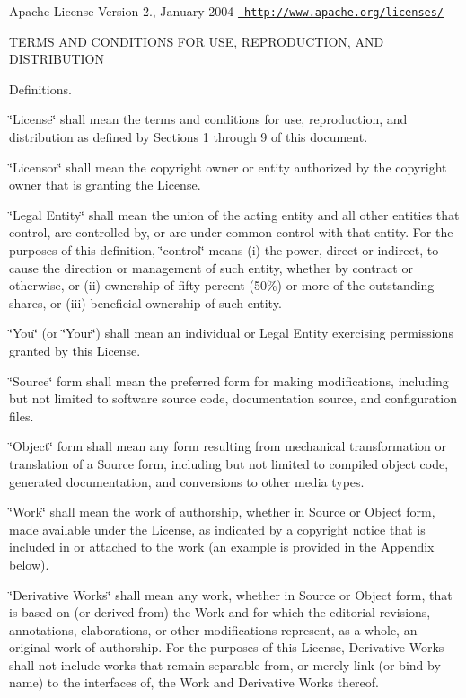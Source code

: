 Apache License Version 2., January 2004 \href{http://www.apache.org/licenses/}{\texttt{ http\+://www.\+apache.\+org/licenses/}}

TERMS AND CONDITIONS FOR USE, REPRODUCTION, AND DISTRIBUTION


\begin{DoxyEnumerate}
\item Definitions.

\char`\"{}\+License\char`\"{} shall mean the terms and conditions for use, reproduction, and distribution as defined by Sections 1 through 9 of this document.

\char`\"{}\+Licensor\char`\"{} shall mean the copyright owner or entity authorized by the copyright owner that is granting the License.

\char`\"{}\+Legal Entity\char`\"{} shall mean the union of the acting entity and all other entities that control, are controlled by, or are under common control with that entity. For the purposes of this definition, \char`\"{}control\char`\"{} means (i) the power, direct or indirect, to cause the direction or management of such entity, whether by contract or otherwise, or (ii) ownership of fifty percent (50\%) or more of the outstanding shares, or (iii) beneficial ownership of such entity.

\char`\"{}\+You\char`\"{} (or \char`\"{}\+Your\char`\"{}) shall mean an individual or Legal Entity exercising permissions granted by this License.

\char`\"{}\+Source\char`\"{} form shall mean the preferred form for making modifications, including but not limited to software source code, documentation source, and configuration files.

\char`\"{}\+Object\char`\"{} form shall mean any form resulting from mechanical transformation or translation of a Source form, including but not limited to compiled object code, generated documentation, and conversions to other media types.

\char`\"{}\+Work\char`\"{} shall mean the work of authorship, whether in Source or Object form, made available under the License, as indicated by a copyright notice that is included in or attached to the work (an example is provided in the Appendix below).

\char`\"{}\+Derivative Works\char`\"{} shall mean any work, whether in Source or Object form, that is based on (or derived from) the Work and for which the editorial revisions, annotations, elaborations, or other modifications represent, as a whole, an original work of authorship. For the purposes of this License, Derivative Works shall not include works that remain separable from, or merely link (or bind by name) to the interfaces of, the Work and Derivative Works thereof.


\end{DoxyEnumerate}
